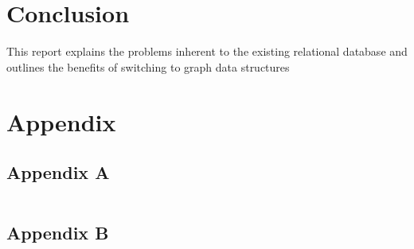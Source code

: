 \documentclass[a4paper]{article}
\begin{document}
\fi





\section{Conclusion}
This report explains the problems inherent to the existing relational database and outlines the benefits of switching to graph data structures 

\pagebreak

\printbibliography

\pagebreak
{}
\section*{Appendix}
\subsection*{Appendix A}
\inputminted{python}{main.py}

\subsection*{Appendix B}
\end{document}
